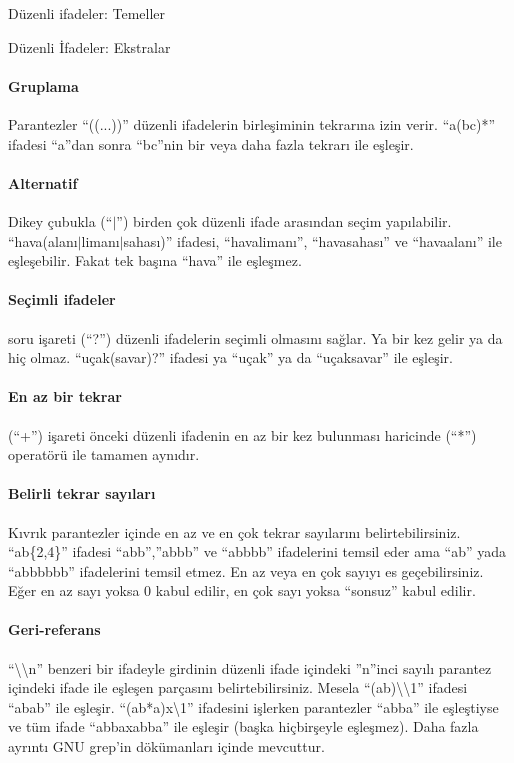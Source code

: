 \begin{section}{Düzenli ifadeler: Temeller}
\begin{subsection}{Düzenli İfadeler: Ekstralar}
\paragraph{Gruplama}{ Parantezler “((...))” düzenli ifadelerin birleşiminin tekrarına izin verir. “a(bc)*” ifadesi “a”dan sonra “bc”nin bir veya daha fazla tekrarı ile eşleşir.}
\paragraph{Alternatif} {Dikey çubukla (“$\vert$”) birden çok düzenli ifade arasından seçim yapılabilir. “hava(alanı$\vert$limanı$\vert$sahası)” ifadesi, “havalimanı”, “havasahası” ve “havaalanı” ile eşleşebilir. Fakat tek başına “hava” ile eşleşmez.}
\paragraph{Seçimli ifadeler} {soru işareti (“?”) düzenli ifadelerin seçimli olmasını sağlar. Ya bir kez gelir ya da hiç olmaz. “uçak(savar)?” ifadesi ya “uçak” ya da “uçaksavar” ile eşleşir.}
\paragraph{En az bir tekrar}{ (“+”) işareti önceki düzenli ifadenin en az bir kez bulunması haricinde (“*”) operatörü ile tamamen aynıdır. }
\paragraph{Belirli tekrar sayıları}{ Kıvrık parantezler içinde en az ve en çok tekrar sayılarını belirtebilirsiniz. “ab\{2,4\}” ifadesi “abb”,”abbb” ve “abbbb” ifadelerini temsil eder ama “ab” yada “abbbbbb” ifadelerini temsil etmez. En az veya en çok sayıyı es geçebilirsiniz. Eğer en az sayı yoksa 0 kabul edilir, en çok sayı yoksa  “sonsuz” kabul edilir.}
\paragraph{Geri-referans}{ “\textbackslash \textbackslash n” benzeri bir ifadeyle girdinin düzenli ifade içindeki ”n”inci sayılı parantez içindeki ifade ile eşleşen parçasını belirtebilirsiniz. Mesela “(ab)\textbackslash \textbackslash 1” ifadesi “abab” ile eşleşir. “(ab*a)x\textbackslash 1” ifadesini işlerken parantezler “abba” ile eşleştiyse ve tüm ifade “abbaxabba” ile eşleşir (başka hiçbirşeyle eşleşmez). Daha fazla ayrıntı GNU grep’in dökümanları içinde mevcuttur.}

\end{subsection}
\end{section}
